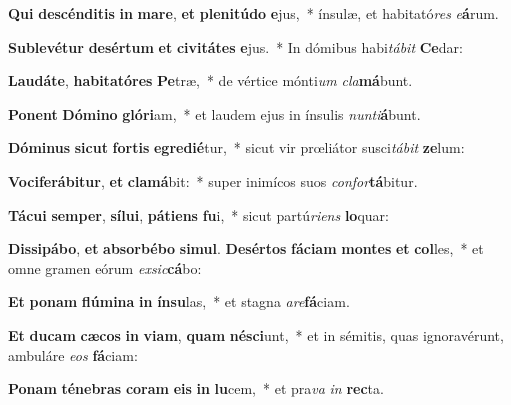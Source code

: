 \item \textbf{Qui} \textbf{de}\textbf{scén}\textbf{di}\textbf{tis} \textbf{in} \textbf{ma}\textbf{re}, \textbf{et} \textbf{ple}\textbf{ni}\textbf{tú}\textbf{do} \textbf{e}jus,~* ínsulæ, et habitató\textit{res} \textit{e}\textbf{á}rum.
\item \textbf{Sub}\textbf{le}\textbf{vé}\textbf{tur} \textbf{de}\textbf{sér}\textbf{tum} \textbf{et} \textbf{ci}\textbf{vi}\textbf{tá}\textbf{tes} \textbf{e}jus.~* In dómibus habi\textit{tá}\textit{bit} \textbf{Ce}dar:
\item \textbf{Lau}\textbf{dá}\textbf{te}, \textbf{ha}\textbf{bi}\textbf{ta}\textbf{tó}\textbf{res} \textbf{Pe}træ,~* de vértice mónti\textit{um} \textit{cla}\textbf{má}bunt.
\item \textbf{Po}\textbf{nent} \textbf{Dó}\textbf{mi}\textbf{no} \textbf{gló}\textbf{ri}am,~* et laudem ejus in ínsulis \textit{nun}\textit{ti}\textbf{á}bunt.
\item \textbf{Dó}\textbf{mi}\textbf{nus} \textbf{sic}\textbf{ut} \textbf{for}\textbf{tis} \textbf{e}\textbf{gre}\textbf{di}\textbf{é}tur,~* sicut vir prœliátor susci\textit{tá}\textit{bit} \textbf{ze}lum:
\item \textbf{Vo}\textbf{ci}\textbf{fe}\textbf{rá}\textbf{bi}\textbf{tur}, \textbf{et} \textbf{cla}\textbf{má}bit:~* super inimícos suos \textit{con}\textit{for}\textbf{tá}bitur.
\item \textbf{Tá}\textbf{cu}\textbf{i} \textbf{sem}\textbf{per}, \textbf{sí}\textbf{lu}\textbf{i}, \textbf{pá}\textbf{ti}\textbf{ens} \textbf{fu}i,~* sicut partú\textit{ri}\textit{ens} \textbf{lo}quar:
\item \textbf{Dis}\textbf{si}\textbf{pá}\textbf{bo}, \textbf{et} \textbf{ab}\textbf{sor}\textbf{bé}\textbf{bo} \textbf{si}\textbf{mul}. \textbf{De}\textbf{sér}\textbf{tos} \textbf{fá}\textbf{ci}\textbf{am} \textbf{mon}\textbf{tes} \textbf{et} \textbf{col}les,~* et omne gramen eórum \textit{ex}\textit{sic}\textbf{cá}bo:
\item \textbf{Et} \textbf{po}\textbf{nam} \textbf{flú}\textbf{mi}\textbf{na} \textbf{in} \textbf{ín}\textbf{su}las,~* et stagna \textit{a}\textit{re}\textbf{fá}ciam.
\item \textbf{Et} \textbf{du}\textbf{cam} \textbf{cæ}\textbf{cos} \textbf{in} \textbf{vi}\textbf{am}, \textbf{quam} \textbf{né}\textbf{sci}unt,~* et in sémitis, quas ignoravérunt, ambuláre \textit{e}\textit{os} \textbf{fá}ciam:
\item \textbf{Po}\textbf{nam} \textbf{té}\textbf{ne}\textbf{bras} \textbf{co}\textbf{ram} \textbf{e}\textbf{is} \textbf{in} \textbf{lu}cem,~* et pra\textit{va} \textit{in} \textbf{rec}ta.
